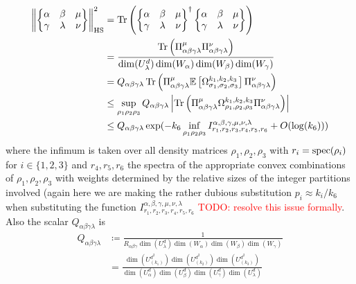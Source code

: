 \documentclass[notitlepage, 10pt]{article}
\begin{document}
\begin{align}
    \left\lVert\begin{Bmatrix}\alpha & \beta & \mu \\ \gamma & \lambda & \nu \end{Bmatrix}\right\rVert_{\mathrm{HS}}^2
    &= \operatorname{Tr}\left(\begin{Bmatrix}\alpha & \beta & \mu \\ \gamma & \lambda & \nu \end{Bmatrix}^{\dagger}\begin{Bmatrix}\alpha & \beta & \mu \\ \gamma & \lambda & \nu \end{Bmatrix}\right) \\
    &= \frac{\operatorname{Tr}\left(\Pi_{\alpha\beta\gamma\lambda}^{\mu}\Pi_{\alpha\beta\gamma\lambda}^{\nu}\right)}{\dim(U^{d}_{\lambda})\dim(W_\alpha)\dim(W_{\beta})\dim(W_{\gamma})} \\
    &= Q_{\alpha\beta\gamma\lambda}\operatorname{Tr}\left(\Pi_{\alpha\beta\gamma\lambda}^{\mu} \mathbb E\left[\Omega_{\sigma_1,\sigma_2,\sigma_3}^{k_1, k_2, k_3}\right] \Pi_{\alpha\beta\gamma\lambda}^{\nu}\right)  \\
    &\leq \sup_{\rho_1 \rho_2 \rho_3} Q_{\alpha\beta\gamma\lambda}\left|\operatorname{Tr}\left(\Pi_{\alpha\beta\gamma\lambda}^{\mu}\Omega_{\rho_1,\rho_2,\rho_3}^{k_1, k_2, k_3} \Pi_{\alpha\beta\gamma\lambda}^{\nu}\right)\right|  \\
    &\leq Q_{\alpha\beta\gamma\lambda} \exp( - k_6 \inf_{\rho_1\rho_2\rho_3} I_{r_1, r_2, r_3, r_4, r_5, r_6}^{\alpha, \beta, \gamma, \mu, \nu, \lambda} + O(\log(k_6)))
\end{align}
where the infimum is taken over all density matrices $\rho_1, \rho_2, \rho_3$ with $r_i = \operatorname{spec}(\rho_i)$ for $i \in \{1,2,3\}$ and $r_4,r_5,r_6$ the spectra of the appropriate convex combinations of $\rho_1,\rho_2,\rho_3$ with weights determined by the relative sizes of the integer partitions involved (again here we are making the rather dubious substitution $p_i \approx k_i /k_6$ when substituting the function $I_{r_1, r_2, r_3, r_4, r_5, r_6}^{\alpha, \beta, \gamma, \mu, \nu, \lambda}$ \textcolor{red}{TODO: resolve this issue formally}.
Also the scalar $Q_{\alpha\beta\gamma\lambda}$ is
\begin{align}
    Q_{\alpha\beta\gamma\lambda} 
    &\coloneq \frac{1}{ R_{\alpha\beta\gamma} \dim(U^{d}_{\lambda}) \dim(W_\alpha) \dim(W_{\beta}) \dim(W_{\gamma})} \\
    &= \frac{\dim(U^{d^2}_{(k_1)})\dim(U^{d^2}_{(k_2)})\dim(U^{d^2}_{(k_3)})}{\dim(U^d_\alpha)\dim(U^d_{\beta})\dim(U^d_{\gamma})\dim(U^d_{\lambda})}
\end{align}
\end{document}
